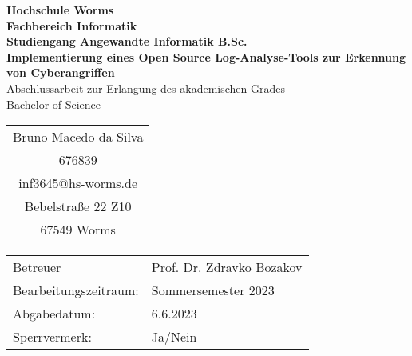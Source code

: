 \begin{titlepage}
    \vspace*{2mm}
    \begin{center}
        \Large
        \textbf{Hochschule Worms}\\
        \textbf{Fachbereich Informatik}\\
        \textbf{Studiengang Angewandte Informatik B.Sc.}\\
        \vspace{2.5cm}
        \textbf{Implementierung eines Open Source Log-Analyse-Tools zur Erkennung von Cyberangriffen}\\
        \vspace{1cm}
        \large
        Abschlussarbeit zur Erlangung des akademischen Grades \\
        Bachelor of Science
        \vspace{2cm}
        \begin {table}[ht]
        \centering
            \begin{tabular}{c}
                Bruno Macedo da Silva  \\ 
                676839                \\
                inf3645@hs-worms.de   \\
                Bebelstraße 22 Z10    \\
                67549 Worms            \\
            \end{tabular}
        \end {table}
        \vspace{1.5cm}
        \large
        \vspace{1cm}
        \begin{table}[h]
            \centering
            \begin{tabular}{l l}
                Betreuer                  & Prof. Dr. Zdravko Bozakov \\
                Bearbeitungszeitraum:     & Sommersemester 2023 \\
                Abgabedatum:              & 6.6.2023 \\
                Sperrvermerk:             & Ja/Nein \\
            \end{tabular}
        \end{table}    
    \end{center}
    \normalsize
    \vfill
\end{titlepage}